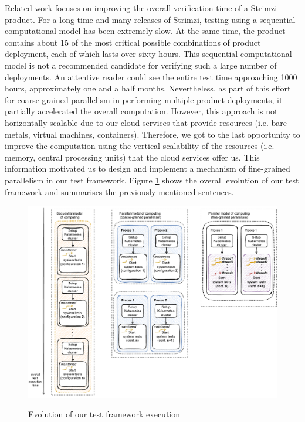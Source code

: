 Related work focuses on improving the overall verification time of a Strimzi product.
For a long time and many releases of Strimzi, testing using a sequential computational model has been extremely slow.
At the same time, the product contains about 15 of the most critical possible combinations of product deployment, each of which lasts over sixty hours.
This sequential computational model is not a recommended candidate for verifying such a large number of deployments.
An attentive reader could see the entire test time approaching 1000 hours, approximately one and a half months.
Nevertheless, as part of this effort for coarse-grained parallelism in performing multiple product deployments, it partially accelerated the overall computation. However, this approach is not horizontally scalable due to our cloud services that provide resources (i.e. bare metals, virtual machines, containers).
Therefore, we got to the last opportunity to improve the computation using the vertical scalability of the resources (i.e. memory, central processing units) that the cloud services offer us.
This information motivated us to design and implement a mechanism of fine-grained parallelism in our test framework.
Figure \ref{00:fig:evolution} shows the overall evolution of our test framework and summarises the previously mentioned sentences.

\begin{figure}[!ht]
    \centering
    \includegraphics[scale=0.7]{obrazky-figures/01-intro/00-intro-better-one}
    \label{00:fig:evolution}
    \caption{Evolution of our test framework execution}
\end{figure}

